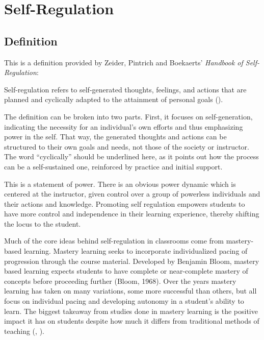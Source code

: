 \chapter{Self-Regulation}

\section{Definition}
This is a definition provided by Zeider, Pintrich and Boekaerts' \emph{Handbook of Self-Regulation}:
\begin{displayquote}
  Self-regulation refers to self-generated thoughts, feelings, and actions that are planned and cyclically adapted to the attainment of personal goals (\cite{zeider}).
\end{displayquote}

The definition can be broken into two parts. First, it focuses on self-generation, indicating the necessity for an individual's own efforts and thus emphasizing power in the self. That way, the generated thoughts and actions can be structured to their own goals and needs, not those of the society or instructor. The word ``cyclically'' should be underlined here, as it points out how the process can be a self-sustained one, reinforced by practice and initial support.

This is a statement of power. There is an obvious power dynamic which is centered at the instructor, given control over a group of powerless individuals and their actions and knowledge. Promoting self regulation empowers students to have more control and independence in their learning experience, thereby shifting the locus to the student.

Much of the core ideas behind self-regulation in classrooms come from mastery-based learning. Mastery learning seeks to incorporate individualized pacing of progression through the course material. Developed by Benjamin Bloom, mastery based learning expects students to have complete or near-complete mastery of concepts before proceeding further (Bloom, 1968). Over the years mastery learning has taken on many variations, some more successful than others, but all focus on individual pacing and developing autonomy in a student's ability to learn. The biggest takeaway from studies done in mastery learning is the positive impact it has on students despite how much it differs from traditional methods of teaching (\cite{zollinger_impact_2017}, \cite{bradley_evaluating_2017}).

